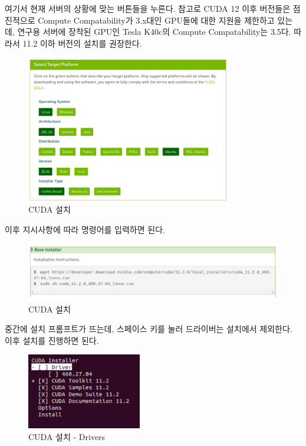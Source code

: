 여기서 현재 서버의 상황에 맞는 버튼들을 누른다. 참고로 CUDA 12 이후 버전들은 점진적으로 Compute Compatability가 3.x대인 GPU들에 대한 지원을 제한하고 있는데, 연구용 서버에 장착된 GPU인 Tesla K40c의 Compute Compatability는 3.5다. 따라서 11.2 이하 버전의 설치를 권장한다.
\begin{figure}[H]
	\begin{center}
        \includegraphics[width=9cm]{cuda1}
        \caption{CUDA 설치}
    \end{center}
\end{figure}
이후 지시사항에 따라 명령어를 입력하면 된다.
\begin{figure}[H]
	\begin{center}
        \includegraphics[width=12cm]{cuda2}
        \caption{CUDA 설치}
    \end{center}
\end{figure}


중간에 설치 프롬프트가 뜨는데, 스페이스 키를 눌러 드라이버는 설치에서 제외한다. 이후 설치를 진행하면 된다.
\begin{figure}[H]
	\begin{center}
        \includegraphics[width=5cm]{cuda3}
        \caption{CUDA 설치 - Drivers}
    \end{center}
\end{figure}

